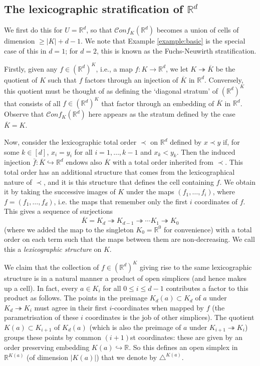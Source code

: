 \documentclass[12pt,letterpaper]{amsart}
\numberwithin{equation}{section}
\def\RR{{\mathbb R}}
\def\tri{\triangle}
\newcommand\conf{\mathscr{C}\!\mathit{onf}\!}
\theoremstyle{remark}
\begin{document}
\subsection{The lexicographic stratification of $\RR^d$}
We first do this for $U=\RR^d$, so that $\conf_K(\RR^d)$ becomes a union of cells of dimension $\ge |K|+d-1$. We note that Example \ref{example:basic} is the special case of this in $d=1$; for $d=2$, this is known as the Fuchs-Neuwirth stratification.


Firstly, given any $f\in (\RR^d)^K$, i.e.,  a map $f: K\to \RR^d$, we let $K\twoheadrightarrow\overline K$ be the quotient of $K$ such that $f$ factors through an injection of ${\overline{K}}$ in $\RR^d$. Conversely, this quotient must be thought of as  defining the  `diagonal stratum' of $(\RR^d)^K$ that consists of all 
$ f\in (\RR^d)^K$ that factor through an embedding of $\overline K$ in $\RR^d$. Observe that $\conf_K(\RR^d)$ here appears as the stratum  defined by the case $\overline K=K$.

Now, consider the lexicographic total order $\prec$ on $\RR^d$ defined by 
$x\prec y$ if, for some $k\in [d]$, $x_i=y_i$  for all $i=1, \dots, k-1$ and $x_k<y_k$. Then the induced injection    $\bar f: \overline K\hookrightarrow \RR^d$ endows also $\overline K$ with a total order
inherited from $\prec$. This total order has an additional structure that comes from the lexicographical nature of $\prec$, and it is this  structure that defines the cell containing $f$. We obtain it by  taking the  successive images of $K$ under the maps $(f_1, \dots, f_i)$, where $f=(f_1, \dots, f_d)$, i.e. the maps that remember only the first $i$ coordinates of $f$. This gives a sequence of surjections 
\[
\overline K=K_d\twoheadrightarrow K_{d-1}\twoheadrightarrow \cdots K_1\twoheadrightarrow K_0
\]
(where we added the map to the  singleton $K_0=\RR^0$ for convenience) with a total order on each term such that the maps between them are non-decreasing. We call this a \textit{lexicographic structure} on $K$.

We claim that the  collection of $f\in (\RR^d)^K$ giving rise to the same lexicographic structure is in a natural manner a product of open simplices (and hence makes up a cell). In fact, every $a\in K_i$ for all $0\le i\le d-1$ contributes a factor to this product as follows.
The points in the preimage $K_d(a)\subset K_d$ of  $a$ under $K_d\twoheadrightarrow K_i$ must agree in their first $i$-coordinates when mapped by $f$ (the parametrisation of these $i$ coordinates is the job of other simplices). The quotient $K(a)\subset K_{i+1}$ of $K_d(a)$ (which is also the preimage of $a$ under $K_{i+1}\twoheadrightarrow K_i$) groups these points by common $(i+1)$st coordinates: these are given by an order preserving embedding $K(a)\hookrightarrow \RR$. So this defines an open simplex in 
$\RR^{K(a)}$ (of dimension $|K(a)|$) that we denote by $\tri^{K(a)}$.
\end{document}
